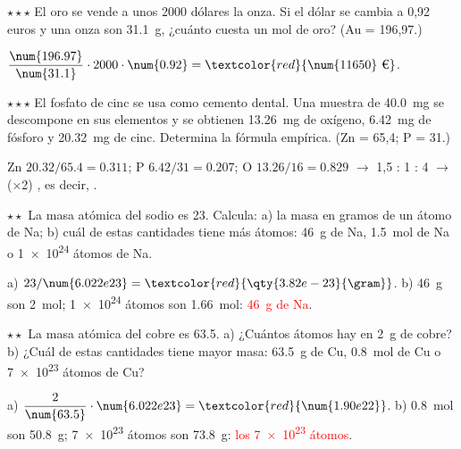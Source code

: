 \begin{exercise}
    \(\star\star\star\) El oro se vende a unos 2000 dólares la onza. Si el dólar se cambia a 0,92 euros y una onza son \qty{31.1}{\gram},
    ¿cuánto cuesta un mol de oro? (Au = 196,97.)
    \begin{solu}
        \(\dfrac{\num{196.97}}{\num{31.1}} \cdot 2000 \cdot \num{0.92} = \textcolor{red}{\num{11650}\text{ €}}\).
    \end{solu}
\end{exercise}

\begin{exercise}
    \(\star\star\star\) El fosfato de cinc se usa como cemento dental. Una muestra de \qty{40.0}{\milli\gram} se descompone en sus
    elementos y se obtienen \qty{13.26}{\milli\gram} de oxígeno, \qty{6.42}{\milli\gram} de fósforo y \qty{20.32}{\milli\gram} de cinc.
    Determina la fórmula empírica. (Zn = 65,4; P = 31.)
    \begin{solu}
        Zn \(\num{20.32}/\num{65.4} = \num{0.311}\); P \(\num{6.42}/31 = \num{0.207}\); O \(\num{13.26}/16 = \num{0.829}\) \(\rightarrow\) 1,5 : 1 : 4
        \(\rightarrow\) (×2) \textcolor{red}{}, es decir, .
    \end{solu}
\end{exercise}

\begin{exercise}
    \(\star\star\) La masa atómica del sodio es \qty{23}{\uma}. Calcula: a) la masa en gramos de un átomo de Na; b) cuál de estas
    cantidades tiene más átomos: \qty{46}{\gram} de Na, \qty{1.5}{\mole} de Na o \num{1e24} átomos de Na.
    \begin{solu}
        a) \(23/\num{6.022e23} = \textcolor{red}{\qty{3.82e-23}{\gram}}\). b) \qty{46}{\gram} son \qty{2}{\mole}; \num{1e24} átomos son \qty{1.66}{\mole}:
        \textcolor{red}{\qty{46}{\gram} de Na}.
    \end{solu}
\end{exercise}

\begin{exercise}
    \(\star\star\) La masa atómica del cobre es \qty{63.5}{\uma}. a) ¿Cuántos átomos hay en \qty{2}{\gram} de cobre? b) ¿Cuál de estas cantidades
    tiene mayor masa: \qty{63.5}{\gram} de Cu, \qty{0.8}{\mole} de Cu o \num{7e23} átomos de Cu?
    \begin{solu}
        a) \(\dfrac{2}{\num{63.5}} \cdot \num{6.022e23} = \textcolor{red}{\num{1.90e22}}\). b) \qty{0.8}{\mole} son \qty{50.8}{\gram}; \num{7e23} átomos son
        \qty{73.8}{\gram}: \textcolor{red}{los \num{7e23} átomos}.
    \end{solu}
\end{exercise}

